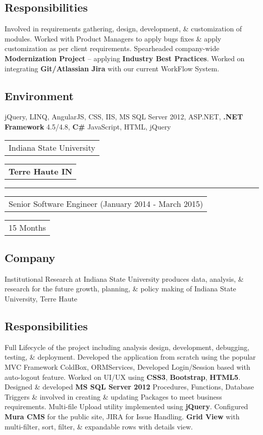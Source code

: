 \documentclass[letterpaper,11pt]{article}
\begin{document}
    \subsection{Responsibilities}
    Involved in requirements gathering, design, development, \& customization of modules. Worked with Product Managers to apply bugs fixes \& apply customization as per client requirements. Spearheaded company-wide \textbf{Modernization Project} – applying \textbf{Industry Best Practices}. Worked on integrating \textbf{Git/Atlassian Jira} with our current WorkFlow System.

    \subsection{Environment}
    jQuery, LINQ, AngularJS, CSS, IIS, MS SQL Server 2012, ASP.NET, \textbf{.NET Framework} 4.5/4.8, \textbf{C\#} JavaScript, HTML, jQuery
    


    \vspace{1.27cm}
    \noindent
    \begin{tabular}[t]{@{}l}
    \Large{Indiana State University}
    \end{tabular}
    \hfill
    \begin{tabular}[t]{l@{}}
    \textbf{Terre Haute IN}
    \end{tabular}
    \noindent\rule{\textwidth}{0.5pt}
    \begin{tabular}[t]{@{}l}
    Senior Software Engineer (January 2014 - March 2015)
    \end{tabular}
    \hfill
    \begin{tabular}[t]{l@{}}
    15 Months
    \end{tabular}

    \subsection{Company}
    Institutional Research at Indiana State University produces data, analysis, \& research for the future growth, planning, \& policy making of Indiana State University, Terre Haute

    \subsection{Responsibilities}
    Full Lifecycle of the project including analysis design, development, debugging, testing, \& deployment. Developed the application from scratch using the popular MVC Framework ColdBox, ORMServices, Developed Login/Session based with auto-logout feature. Worked on UI/UX using \textbf{CSS3}, \textbf{Bootstrap}, \textbf{HTML5}. Designed \& developed \textbf{MS SQL Server 2012} Procedures, Functions, Database Triggers \& involved in creating \& updating Packages to meet business requirements. Multi-file Upload utility implemented using \textbf{jQuery}. Configured \textbf{Mura CMS} for the public site, JIRA for Issue Handling. \textbf{Grid View} with multi-filter, sort, filter, \& expandable rows with details view.
\end{document}
